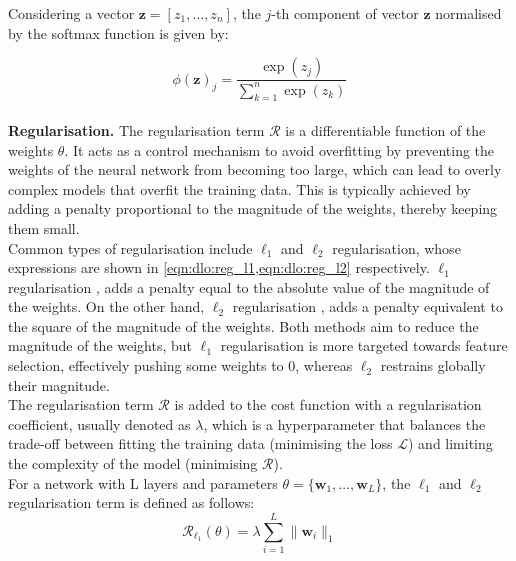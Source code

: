 Considering a vector $\mathbf{z} = [z_1, \dots, z_n]$, the $j$-th component of
vector $\mathbf{z}$ normalised by the softmax function is given by: 

\begin{equation}
  \label{eqn:dlo:softmax}
  \phi(\mathbf{z})_j = \frac{\exp(z_j)}{\displaystyle\sum_{k=1}^{n} \exp(z_k)}
\end{equation}\\

\noindent \textbf{Regularisation.} The regularisation term $\mathcal{R}$ is a
differentiable function of the weights $\theta$. It acts as a control mechanism
to avoid overfitting by preventing the weights of the neural network from
becoming too large, which can lead to overly complex models that overfit the
training data. This is typically achieved by adding a penalty proportional to
the magnitude of the weights, thereby keeping them small.\\

Common types of regularisation include $\ell_1$ and $\ell_2$ regularisation,
whose expressions are shown in \cref{eqn:dlo:reg_l1,eqn:dlo:reg_l2}
respectively. $\ell_1$ regularisation \cite{tibshirani1996regression}, adds a
penalty equal to the absolute value of the magnitude of the weights. On the
other hand, $\ell_2$ regularisation \cite{hoerl1970ridge}, adds a penalty
equivalent to the square of the magnitude of the weights. Both methods aim to
reduce the magnitude of the weights, but $\ell_1$ regularisation is more
targeted towards feature selection, effectively pushing some weights to $0$,
whereas $\ell_2$ restrains globally their magnitude.\\

The regularisation term $\mathcal{R}$ is added to the cost function with a
regularisation coefficient, usually denoted as $\lambda$, which is a
hyperparameter that balances the trade-off between fitting the training data
(minimising the loss $\mathcal{L}$) and limiting the complexity of the model
(minimising $\mathcal{R}$).\\

For a network with L layers and parameters $\theta=\{\mathbf{w}_1, \dots,
\mathbf{w}_L\}$, the $\ell_1$ and $\ell_2$ regularisation term is defined as
follows:\\

\begin{equation}
  \label{eqn:dlo:reg_l1}
  \mathcal{R}_{\ell_1}(\theta) = \lambda \sum_{i=1}^{L} \| \mathbf{w}_i \|_1
\end{equation}\\

